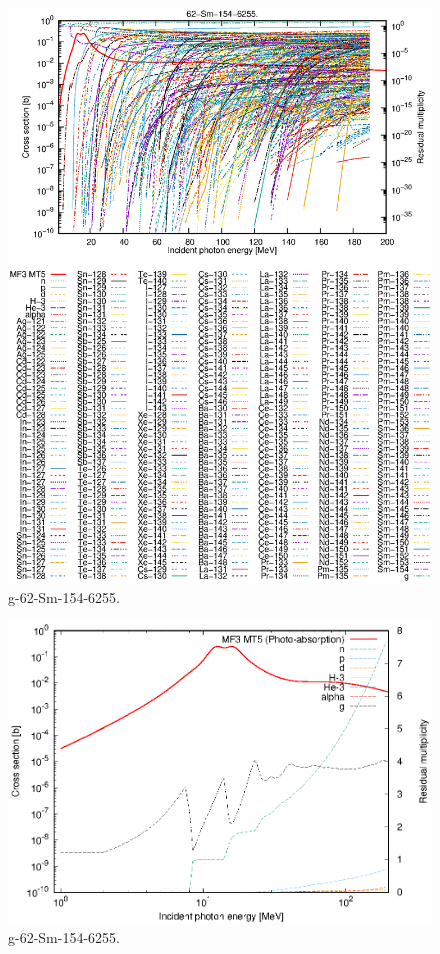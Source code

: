 \begin{figure}
 \includegraphics[width=\linewidth]{eps/g_62-Sm-154_6255.eps}
  \caption{g-62-Sm-154-6255.}
\end{figure}
\newpage \clearpage

\begin{figure}
 \includegraphics[width=\linewidth]{eps-log/g_62-Sm-154_6255.eps}
 \caption{g-62-Sm-154-6255.}
\end{figure}
\newpage \clearpage

